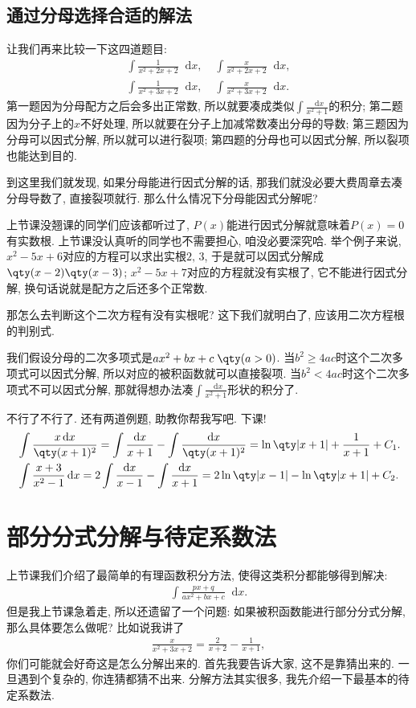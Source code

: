 \documentclass{ctexbook}
\newcommand*{\dif}{\mathop{}\!\mathrm{d}}
\begin{document}
{\subsection{通过分母选择合适的解法}
让我们再来比较一下这四道题目: 
\begin{align*}
\int\frac{1}{x^{2}+2x+2}\dif{x},\;{}&\int\frac{x}{x^{2}+2x+2}\dif{x},\\
\int\frac{1}{x^{2}+3x+2}\dif{x},\;{}&\int\frac{x}{x^{2}+3x+2}\dif{x}
.\end{align*}
第一题因为分母配方之后会多出正常数, 所以就要凑成类似$\int\frac{\dif{x}}{x^{2}+1}$的积分; 第二题因为分子上的$x$不好处理, 所以就要在分子上加减常数凑出分母的导数; 第三题因为分母可以因式分解, 所以就可以进行裂项; 第四题的分母也可以因式分解, 所以裂项也能达到目的. \par
到这里我们就发现, 如果分母能进行因式分解的话, 那我们就没必要大费周章去凑分母导数了, 直接裂项就行. 那么什么情况下分母能因式分解呢? \par
上节课没翘课的同学们应该都听过了, $P(x)$能进行因式分解就意味着$P(x)=0$有实数根. 上节课没认真听的同学也不需要担心, 咱没必要深究哈. 举个例子来说, $x^{2}-5x+6$对应的方程可以求出实根$2,\,3$, 于是就可以因式分解成$\qty(x-2)\qty(x-3)$; $x^{2}-5x+7$对应的方程就没有实根了, 它不能进行因式分解, 换句话说就是配方之后还多个正常数. \par
那怎么去判断这个二次方程有没有实根呢? 这下我们就明白了, 应该用二次方程根的判别式. \par
我们假设分母的二次多项式是$ax^{2}+bx+c\;\qty(a>0)$. 当$b^{2}\ge4ac$时这个二次多项式可以因式分解, 所以对应的被积函数就可以直接裂项. 当$b^{2}<4ac$时这个二次多项式不可以因式分解, 那就得想办法凑$\int\frac{\dif{x}}{x^{2}+1}$形状的积分了. \par
不行了不行了. 还有两道例题, 助教你帮我写吧. 下课! 
\begin{align*}
{}&\int\frac{x\dif{x}}{\qty(x+1)^{2}}=\int\frac{\dif{x}}{x+1}-\int\frac{\dif{x}}{\qty(x+1)^{2}}=\ln\qty|x+1|+\frac{1}{x+1}+C_{1}.\\
{}&\int\frac{x+3}{x^{2}-1}\dif{x}=2\int\frac{\dif{x}}{x-1}-\int\frac{\dif{x}}{x+1}=2\ln\qty|x-1|-\ln\qty|x+1|+C_{2}
.\end{align*}\par
\section{部分分式分解与待定系数法}
上节课我们介绍了最简单的有理函数积分方法, 使得这类积分都能够得到解决: 
\begin{align*}
\int\frac{px+q}{ax^{2}+bx+c}\dif{x}
.\end{align*}
但是我上节课急着走, 所以还遗留了一个问题: 如果被积函数能进行部分分式分解, 那么具体要怎么做呢? 比如说我讲了
\begin{align*}
\frac{x}{x^{2}+3x+2}=\frac{2}{x+2}-\frac{1}{x+1}
,\end{align*}
你们可能就会好奇这是怎么分解出来的. 首先我要告诉大家, 这不是靠猜出来的. 一旦遇到个复杂的, 你连猜都猜不出来. 分解方法其实很多, 我先介绍一下最基本的待定系数法. \par
}
\end{document}
